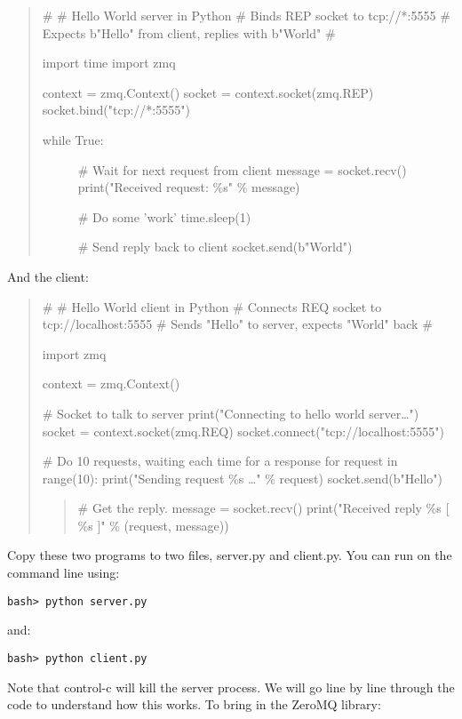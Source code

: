 \begin{quote}
\# \# Hello World server in Python \# Binds REP socket to tcp://*:5555
\# Expects b"Hello" from client, replies with b"World" \#

import time import zmq

context = zmq.Context() socket = context.socket(zmq.REP)
socket.bind("tcp://*:5555")

\begin{description}
\item[while True:]
\# Wait for next request from client message = socket.recv()
print("Received request: \%s" \% message)

\# Do some 'work' time.sleep(1)

\# Send reply back to client socket.send(b"World")
\end{description}
\end{quote}

And the client:

\begin{quote}
\# \# Hello World client in Python \# Connects REQ socket to
tcp://localhost:5555 \# Sends "Hello" to server, expects "World" back \#

import zmq

context = zmq.Context()

\# Socket to talk to server print("Connecting to hello world
server\ldots") socket = context.socket(zmq.REQ)
socket.connect("tcp://localhost:5555")

\# Do 10 requests, waiting each time for a response for request in
range(10): print("Sending request \%s \ldots" \% request)
socket.send(b"Hello")

\begin{quote}
\# Get the reply. message = socket.recv() print("Received reply \%s {[}
\%s {]}" \% (request, message))
\end{quote}
\end{quote}

Copy these two programs to two files, server.py and client.py. You can
run on the command line using:

\begin{verbatim}
bash> python server.py
\end{verbatim}

and:

\begin{verbatim}
bash> python client.py
\end{verbatim}

Note that control-c will kill the server process. We will go line by
line through the code to understand how this works. To bring in the
ZeroMQ library:

